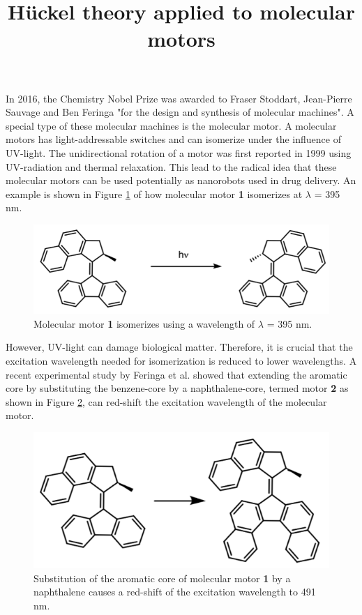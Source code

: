 \documentclass{article}
\begin{document}
\title{H\"uckel theory applied to molecular motors}
\maketitle

In 2016, the Chemistry Nobel Prize was awarded to Fraser Stoddart, Jean-Pierre Sauvage and Ben Feringa "for the design and synthesis of molecular machines".\cite{nobelprizechemistry2016} A special type of these molecular machines is the molecular motor. A molecular motors has light-addressable switches and can isomerize under the influence of UV-light.\cite{Feringa2012} The unidirectional rotation of a motor was first reported in 1999 using UV-radiation and thermal relaxation.\cite{Koumura1999} This lead to the radical idea that these molecular motors can be used potentially as nanorobots used in drug delivery. An example is shown in Figure \ref{fig:mm1} of how molecular motor \textbf{1} isomerizes at $\lambda$ = 395 nm.

\begin{figure}[h]
\centering
\includegraphics[scale=0.75]{./images/scheme1.png}
\caption{Molecular motor \textbf{1} isomerizes using a wavelength of $\lambda$ = 395 nm.}
\label{fig:mm1}
\end{figure} 

However, UV-light can damage biological matter. Therefore, it is crucial that the excitation wavelength needed for isomerization is reduced to lower wavelengths. A recent experimental study by Feringa et al. showed that extending the aromatic core by substituting the benzene-core by a naphthalene-core, termed motor \textbf{2} as shown in Figure \ref{fig:mm2}, can red-shift the excitation wavelength of the molecular motor.\cite{VanLeeuwen2017} 

\begin{figure}[h]
\centering
\includegraphics[scale=0.75]{./images/scheme2.png}
\caption{Substitution of the aromatic core of molecular motor \textbf{1} by a naphthalene causes a red-shift of the excitation wavelength to 491 nm.}
\label{fig:mm2}
\end{figure} 
\end{document}

